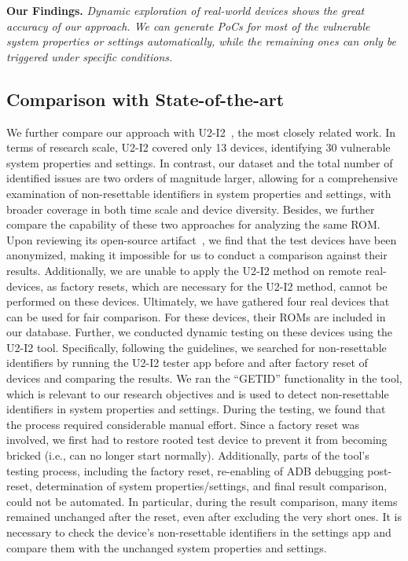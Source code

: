 \noindent \textbf{Our Findings.}
\textit{Dynamic exploration of real-world devices shows the great accuracy of our approach. We can generate PoCs for most of the vulnerable system properties or settings automatically, while the remaining ones can only be triggered under specific conditions.
}

\subsection{Comparison with State-of-the-art}
We further compare our approach with U2-I2~\cite{meng2023post}, the most closely related work.
In terms of research scale, U2-I2 covered only 13 devices, identifying 30 vulnerable system properties and settings. 
In contrast, our dataset and the total number of identified issues are two orders of magnitude larger, allowing for a comprehensive examination of non-resettable identifiers in system properties and settings, with broader coverage in both time scale and device diversity.
Besides, we further compare the capability of these two approaches for analyzing the same ROM.
Upon reviewing its open-source artifact~\cite{gdprartifact}, we find that the test devices have been anonymized, making it impossible for us to conduct a comparison against their results.
Additionally, we are unable to apply the U2-I2 method on remote real-devices, as factory resets, which are necessary for the U2-I2 method, cannot be performed on these devices.
Ultimately, we have gathered four real devices that can be used for fair comparison. For these devices, their ROMs are included in our database.
Further, we conducted dynamic testing on these devices using the U2-I2 tool.
Specifically, following the guidelines, we searched for non-resettable identifiers by running the U2-I2 tester app before and after factory reset of devices and comparing the results.
We ran the ``GETID'' functionality in the tool, which is relevant to our research objectives and is used to detect non-resettable identifiers in system properties and settings.
During the testing, we found that the process required considerable manual effort. 
Since a factory reset was involved, we first had to restore rooted test device to prevent it from becoming bricked (i.e., can no longer start normally).
Additionally, parts of the tool’s testing process, including the factory reset, re-enabling of ADB debugging post-reset, determination of system properties/settings, and final result comparison, could not be automated.
In particular, during the result comparison, many items remained unchanged after the reset, even after excluding the very short ones. 
It is necessary to check the device's non-resettable identifiers in the settings app and compare them with the unchanged system properties and settings.

